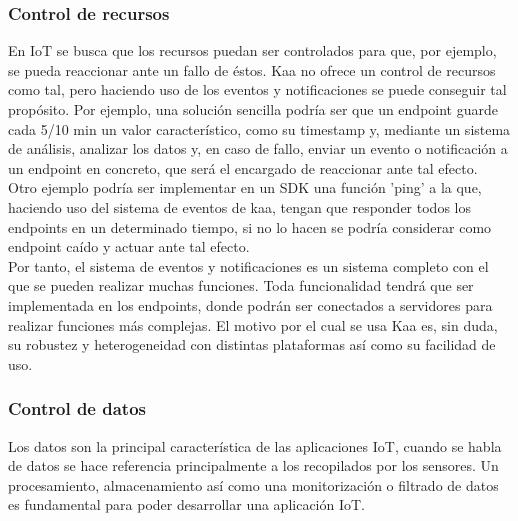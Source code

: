 \documentclass[12pt, twoside]{book}
\begin{document}
\subsubsection*{Control de recursos}
En IoT se busca que los recursos puedan ser controlados para que, por ejemplo, se pueda reaccionar ante un fallo de éstos. Kaa no ofrece un control de recursos como tal, pero haciendo uso de los eventos y notificaciones se puede conseguir tal propósito. Por ejemplo, una solución sencilla podría ser que un endpoint guarde cada 5/10 min un valor característico, como su timestamp y, mediante un sistema de análisis, analizar los datos y, en caso de fallo, enviar un evento o notificación a un endpoint en concreto, que será el encargado de reaccionar ante tal efecto.\\
Otro ejemplo podría ser implementar en un SDK una función 'ping' a la que, haciendo uso del sistema de eventos de kaa, tengan que responder todos los endpoints en un determinado tiempo, si no lo hacen se podría considerar como endpoint caído y actuar ante tal efecto.\\
Por tanto, el sistema de eventos y notificaciones es un sistema completo con el que se pueden realizar muchas funciones. Toda funcionalidad tendrá que ser implementada en los endpoints, donde podrán ser conectados a servidores para realizar funciones más complejas. El motivo por el cual se usa Kaa es, sin duda, su robustez y heterogeneidad con distintas plataformas así como su facilidad de uso. 

\subsubsection*{Control de datos}
Los datos son la principal característica de las aplicaciones IoT, cuando se habla de datos se hace referencia principalmente a los recopilados por los sensores. Un procesamiento, almacenamiento así como una monitorización o filtrado de datos es fundamental para poder desarrollar una aplicación IoT. \\ 
\end{document}
